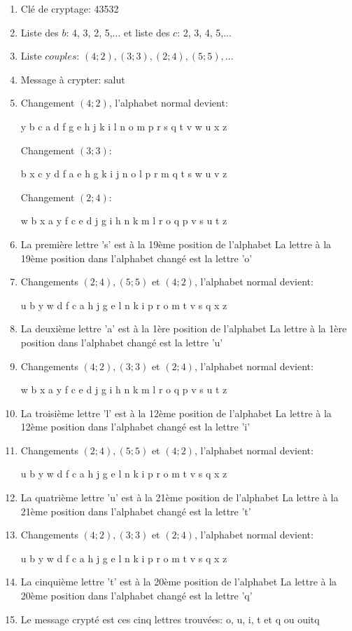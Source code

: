 \documentclass[a4paper,12pt]{report}
\begin{document}
\begin{enumerate}
\item Clé de cryptage: 43532
\item Liste des $b$: 4, 3, 2, 5,... et liste des $c$: 2, 3, 4, 5,...
\item Liste $couples$: $(4;2), (3;3), (2;4), (5;5), ...$
\item Message à crypter: salut
\item Changement $(4;2)$, l'alphabet normal devient:\newline
\centerline{y b c a d f g e h j k i l n o m p r s q t v w u x z} \newline
Changement $(3;3)$:\newline
\centerline{b x c y d f a e h g k i j n o l p r m q t s w u v z} \newline
Changement $(2;4)$:\newline
\centerline{w b x a y f c e d j g i h n k m l r o q p v s u t z}
\item La première lettre 's' est à la 19ème position de l'alphabet \newline
La lettre à la 19ème position dans l'alphabet changé est la lettre 'o'
\item Changements $(2;4), (5;5)$ et $(4;2)$,  l'alphabet normal devient:\newline
\centerline{u b y w d f c a h j g e l n k i p r o m t v s q x z}
\item La deuxième lettre 'a' est à la 1ère position de l'alphabet \newline
La lettre à la 1ère position dans l'alphabet changé est la lettre 'u'
\item Changements $(4;2), (3;3)$ et $(2;4)$,  l'alphabet normal devient:\newline
\centerline{w b x a y f c e d j g i h n k m l r o q p v s u t z}
\item La troisième lettre 'l' est à la 12ème position de l'alphabet \newline
La lettre à la 12ème position dans l'alphabet changé est la lettre 'i'
\item Changements $(2;4), (5;5)$ et $(4;2)$,  l'alphabet normal devient:\newline
\centerline{u b y w d f c a h j g e l n k i p r o m t v s q x z}
\item La quatrième lettre 'u' est à la 21ème position de l'alphabet \newline
La lettre à la 21ème position dans l'alphabet changé est la lettre 't'
\item Changements $(4;2), (3;3)$ et $(2;4)$,  l'alphabet normal devient:\newline
\centerline{u b y w d f c a h j g e l n k i p r o m t v s q x z}
\item La cinquième lettre 't' est à la 20ème position de l'alphabet \newline
La lettre à la 20ème position dans l'alphabet changé est la lettre 'q'
\item Le message crypté est ces cinq lettres trouvées: o, u, i, t et q ou ouitq
\end{enumerate}
\end{document}
